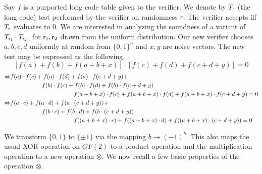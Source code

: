 \documentclass[11pt]{article}
\newcommand{\eat}[1]{}
\newcommand{\R}{{\sf r}}
\begin{document}
Say $f$ is a purported long code table given to the verifier. We
denote by $T_\R$ (the long code) test performed by the verifier on
randomness $\R$. The verifier accepts iff $T_\R$ evaluates to $0$. We
are interested in analyzing the soundness of a variant of $T_{\R_1}
\cdot T_{\R_2}$, for $\R_1, \R_2$ drawn from the uniform
distribution. Our new verifier chooses $a,b,c,d$ uniformly at random
from $\{0,1\}^{n}$ and $x,y$ are noise vectors.\eat{ where each
  coordinate of $x$ and $y$ is set independently to $0$ with
  probability $1 - \rho$ and $1$ otherwise.} The new test may be
expressed as the following.
\[ 
 \left[f(a) + f(b) + f(a + b + x)\right]\cdot\left[f(c) + f(d) + f(c+d+y)\right] = 0
\]
\begin{align*} 
\Leftrightarrow  & f(a) \cdot f(c) + f(a) \cdot f(d) + f(a) \cdot f(c +d +y) + \\ & \hspace*{.75in} f(b) \cdot f(c) + f(b) \cdot f(d) + f(b) \cdot f( c+d+y) \\ & \hspace*{1.5in} f(a+b+x) \cdot f(c) + f(a+b+x) \cdot f(d) + f(a+b+x) \cdot f(c + d+ y)  = 0 \\
\Leftrightarrow &  f(a\cdot c) + f(a\cdot d) + f(a \cdot (c +d +y)) + \\ & \hspace*{.75in} f(b\cdot c) +  f(b\cdot d) + f(b \cdot (c +d +y)) \\ & \hspace*{1.5in} f((a+b+x) \cdot c) + f((a+b+x) \cdot d) + f((a+b+x) \cdot (c+d+y)) = 0 \label{test}
\end{align*}

\noindent We transform $\{0,1\}$ to $\{\pm 1\}$ via the mapping $b
\rightarrow (-1)^b$. This also maps the usual XOR operation on $GF(2)$ to a
product operation and the multiplication operation to a new operation
$\otimes$. We now recall a few basic properties of the operation
$\otimes$.
\end{document}
